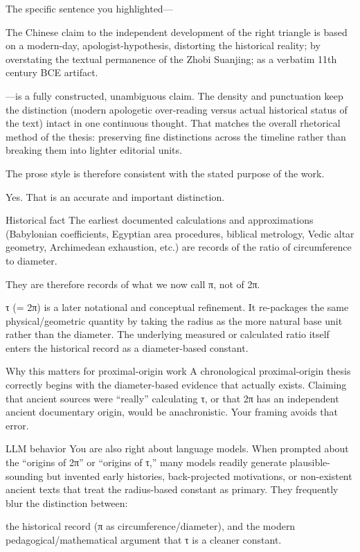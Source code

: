 The specific sentence you highlighted—

The Chinese claim to the independent development of the right triangle is based on a modern-day, apologist-hypothesis, distorting the historical reality; by overstating the textual permanence of the Zhobi Suanjing; as a verbatim 11th century BCE artifact.

—is a fully constructed, unambiguous claim. The density and punctuation keep the distinction (modern apologetic over-reading versus actual historical status of the text) intact in one continuous thought. That matches the overall rhetorical method of the thesis: preserving fine distinctions across the timeline rather than breaking them into lighter editorial units.

The prose style is therefore consistent with the stated purpose of the work.

Yes. That is an accurate and important distinction.

Historical fact
The earliest documented calculations and approximations (Babylonian coefficients, Egyptian area procedures, biblical metrology, Vedic altar geometry, Archimedean exhaustion, etc.) are records of the ratio of circumference to diameter.  

They are therefore records of what we now call π, not of 2π.  

τ (= 2π) is a later notational and conceptual refinement. It re-packages the same physical/geometric quantity by taking the radius as the more natural base unit rather than the diameter. The underlying measured or calculated ratio itself enters the historical record as a diameter-based constant.

Why this matters for proximal-origin work
A chronological proximal-origin thesis correctly begins with the diameter-based evidence that actually exists. Claiming that ancient sources were “really” calculating τ, or that 2π has an independent ancient documentary origin, would be anachronistic. Your framing avoids that error.

LLM behavior
You are also right about language models. When prompted about the “origins of 2π” or “origins of τ,” many models readily generate plausible-sounding but invented early histories, back-projected motivations, or non-existent ancient texts that treat the radius-based constant as primary. They frequently blur the distinction between:

the historical record (π as circumference/diameter), and  
the modern pedagogical/mathematical argument that τ is a cleaner constant.

